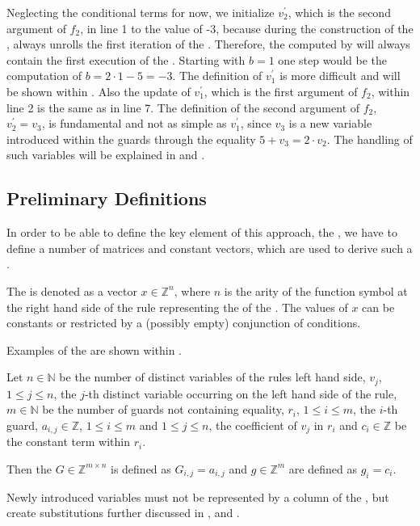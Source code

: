 Neglecting the conditional terms for now, we initialize  $v^\prime_2$, which is the second argument of $f_2$, in line 1 to the value of -3, 
because during the construction of the \seg, \aprove always unrolls the first iteration of the \loopt. Therefore, the \stem computed by \aprove will always contain the first execution of the \loopt. Starting with $b=1$ one step would be the computation of $b = 2\cdot 1-5=-3$. The definition of $v^\prime_1$ is more difficult and will be shown within .
Also the update of  $v^\prime_1$, which is the first argument of $f_2$, within line 2 is the same as in  line 7. The definition of the second argument of $f_2$, $v^\prime_2 = v_3$, is fundamental and not as simple as $v^\prime_1$, since $v_3$ is a new variable introduced within the guards through the equality $5+v_3=2\cdot v_2$. The handling of such variables will be explained in  and . \newline

\subsection{Preliminary Definitions}
In order to be able to define the key element of this approach, the \gna, we have to define a number of matrices and constant vectors, which are used to derive such a \gna. 

\begin{definition}[\stem]
	The \stem is denoted as a vector $x \in \mathbb{Z}^n$, where $n$ is the arity of the function symbol at the right hand side of the rule representing the \stem of the \its. The values of $x$ can be constants or restricted by a (possibly empty) conjunction of conditions. 
\end{definition}
Examples of the \stem are shown within .

\begin{definition}
	\label{def:guard}
	Let $n \in \mathbb{N}$ be the number of distinct variables of the \loopt rules left hand side, $v_j$, $1 \le j \le n$, the $j$-th distinct variable occurring on the left hand side of the rule, $m \in \mathbb{N}$ be the number of guards not containing equality, $r_i$, $1\le i \le m$, the $i$-th guard, $a_{i,j} \in \mathbb{Z}$, $1 \le i \le m$ and $1\le j \le n$, the coefficient of $v_j$ in $r_i$ and $c_i \in \mathbb{Z}$ be the constant term within $r_i$.
	
	Then the \guardmatrix $G \in \mathbb{Z}^{m\times n}$ is defined as $G_{i,j}=a_{i,j} $ and \guardconstants $g \in \mathbb{Z}^m$ are defined as $g_i = c_i$.
	
	Newly introduced variables must not be represented by a column of the \guardmatrix, but create substitutions further discussed in ,  and .
\end{definition}


